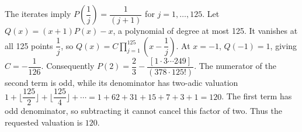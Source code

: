 The iterates imply $P(\dfrac{1}{j})=\dfrac{1}{(j+1)}$ for $j=1,\ldots,125$. Let $Q(x)=(x+1)P(x)-x$, a polynomial of degree at most 125. It vanishes at all 125 points $\dfrac{1}{j}$, so $Q(x)=C\prod_{j=1}^{125}(x-\dfrac{1}{j})$. At $x=-1$, $Q(-1)=1$, giving $C=-\dfrac{1}{126}$. Consequently $P(2)=\dfrac{2}{3}-\dfrac{[1\cdot3\cdots249]}{(378\cdot125!)}$. The numerator of the second term is odd, while its denominator has two-adic valuation $1+\lfloor\dfrac{125}{2}\rfloor+\lfloor\dfrac{125}{4}\rfloor+\cdots=1+62+31+15+7+3+1=120$. The first term has odd denominator, so subtracting it cannot cancel this factor of two. Thus the requested valuation is $\boxed{120}$.
